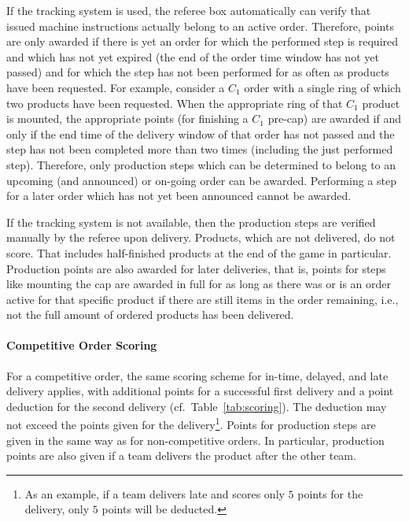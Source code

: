 \documentclass[12pt,twoside]{article}
\newcommand{\reftab}[1]{Table~\ref{#1}}
\begin{document}
If the tracking system is used, the referee box automatically can verify that
issued machine instructions actually belong to an active order.
Therefore, points are only awarded if there is yet an order for which the
performed step is required and which has not yet expired (the end of
the order time window has not yet passed) and for which the step has
not been performed for as often as products have been requested. For
example, consider a $C_1$ order with a single ring of which two
products have been requested. When the appropriate ring of that $C_1$
product is mounted, the appropriate points (for finishing a $C_1$
pre-cap) are awarded if and only if the end time of the delivery
window of that order has not passed and the step has not been
completed more than two times (including the just performed
step). Therefore, only production steps which can be determined to
belong to an upcoming (and announced) or on-going order can be
awarded. Performing a step for a later order which has not yet been
announced cannot be awarded.

If the tracking system is not available, then the production steps are
verified manually by the referee upon delivery.
Products, which are not delivered, do not score. That includes half-finished
products at the end of the game in particular. Production points are
also awarded for later deliveries, that is, points for steps like
mounting the cap are awarded in full for as long as there was or is
an order active for that specific product if there are still items
in the order remaining, i.e., not the full amount of ordered products
has been delivered.
%

\paragraph{Competitive Order Scoring}
For a competitive order, the same scoring scheme for in-time, delayed, and late
delivery applies, with additional points for a successful first delivery and a
point deduction for the second delivery (cf.~\reftab{tab:scoring}). The
deduction may not exceed the points given for the delivery\footnote{As an
example, if a team delivers late and scores only $5$ points for the delivery,
only $5$ points will be deducted.}. Points for production steps are given in the
same way as for non-competitive orders. In particular, production points are
also given if a team delivers the product after the other team.
\end{document}
